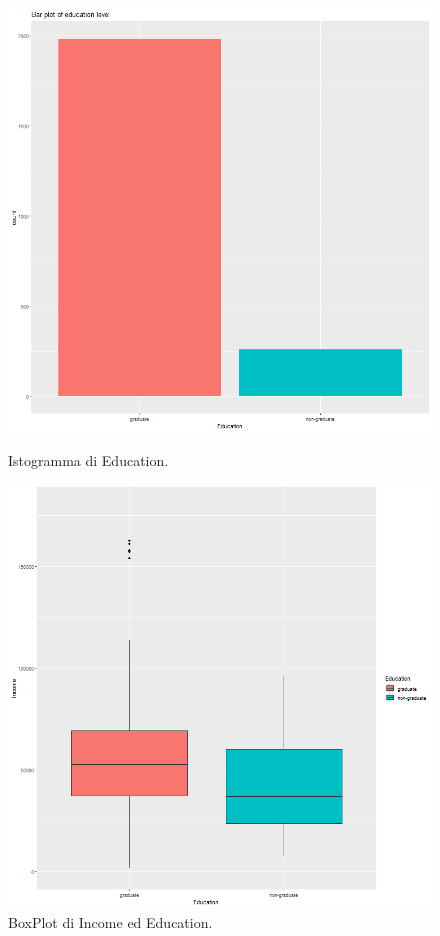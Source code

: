 \documentclass[letterpaper,11pt]{article}
\begin{document}
\begin{figure}[H]
  \centering
  \begin{minipage}[b]{0.4\textwidth}
    \includegraphics[width=\textwidth]{Img/EDA/EDA007.png}
    \caption{Istogramma di Education.}
    \label{fig:IstogrammaEducation}
  \end{minipage}
  \hfill
  \begin{minipage}[b]{0.4\textwidth}
    \includegraphics[width=\textwidth]{Img/EDA/EDA008.png}
    \caption{BoxPlot di Income ed Education.}
     \label{fig:BoxPlotEducation}
  \end{minipage}
\end{figure}
\end{document}
